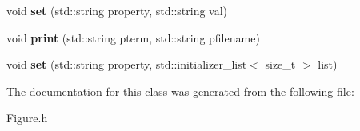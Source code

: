 \begin{DoxyCompactItemize}
\item 
\hypertarget{classkeycpp_1_1_figure_a1f6c04d0276c0419c3feb974639fb7c2}{void {\bfseries set} (std\-::string property, std\-::string val)}\label{classkeycpp_1_1_figure_a1f6c04d0276c0419c3feb974639fb7c2}

\item 
\hypertarget{classkeycpp_1_1_figure_ac6d1881c6dc996eb508adf2126905d38}{void {\bfseries print} (std\-::string pterm, std\-::string pfilename)}\label{classkeycpp_1_1_figure_ac6d1881c6dc996eb508adf2126905d38}

\item 
\hypertarget{classkeycpp_1_1_figure_abceb69bfb4476f2c9423f248bc04a6c8}{void {\bfseries set} (std\-::string property, std\-::initializer\-\_\-list$<$ size\-\_\-t $>$ list)}\label{classkeycpp_1_1_figure_abceb69bfb4476f2c9423f248bc04a6c8}

\end{DoxyCompactItemize}


The documentation for this class was generated from the following file\-:\begin{DoxyCompactItemize}
\item 
Figure.\-h\end{DoxyCompactItemize}
